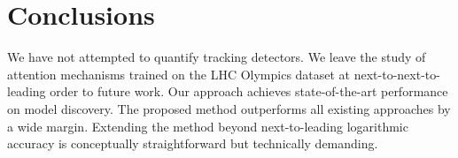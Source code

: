 \section{Conclusions}\label{sec:conclusions}

We have not attempted to quantify tracking detectors. We leave the study
of attention mechanisms trained on the LHC Olympics dataset at
next-to-next-to-leading order to future work. Our approach achieves
state-of-the-art performance on model discovery. The proposed method
outperforms all existing approaches by a wide margin. Extending the
method beyond next-to-leading logarithmic accuracy is conceptually
straightforward but technically demanding.

